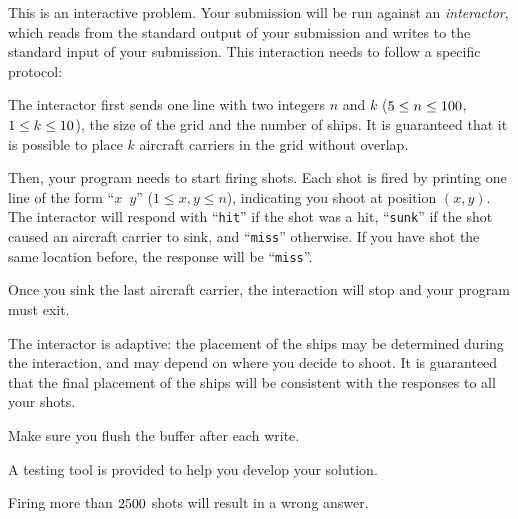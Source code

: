 \begin{Interaction}
    This is an interactive problem.
    Your submission will be run against an \emph{interactor},
    which reads from the standard output of your submission
    and writes to the standard input of your submission.
    This interaction needs to follow a specific protocol:

    The interactor first sends
    one line with two integers $n$ and $k$ ($5 \le n \le 100$, $1 \le k \le 10$),
    the size of the grid and the number of ships.
    It is guaranteed that it is possible to place $k$ aircraft carriers in the grid without overlap.

    Then, your program needs to start firing shots.
    Each shot is fired by printing one line of the form ``\texttt{$x$~$y$}'' ($1 \le x,y \le n$),
    indicating you shoot at position $(x, y)$.
    The interactor will respond with ``\texttt{hit}'' if the shot was a hit,
    ``\texttt{sunk}'' if the shot caused an aircraft carrier to sink, and ``\texttt{miss}'' otherwise.
    If you have shot the same location before,
    the response will be ``\texttt{miss}''.

    Once you sink the last aircraft carrier,
    the interaction will stop and your program must exit.

    The interactor is adaptive:
    the placement of the ships may be determined during the interaction,
    and may depend on where you decide to shoot.
    It is guaranteed that the final placement of the ships
    will be consistent with the responses to all your shots.

    Make sure you flush the buffer after each write.

    A testing tool is provided to help you develop your solution.

    Firing more than $2500$ shots will result in a wrong answer.
\end{Interaction}
